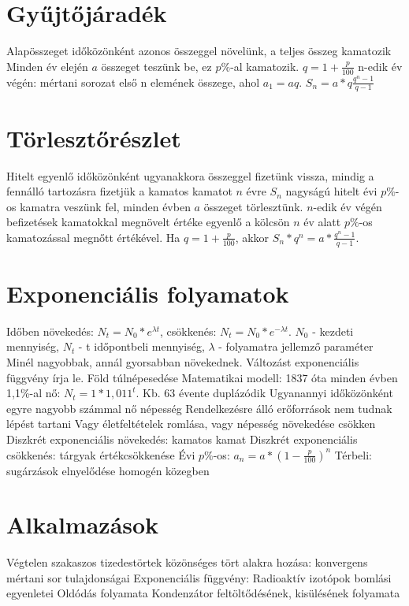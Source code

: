 \documentclass[twoside,12pt]{report}
\theoremstyle{definition}
\begin{document}
\section{Gyűjtőjáradék}
	\begin{outline}
		\1 Alapösszeget időközönként azonos összeggel növelünk, a teljes összeg kamatozik
		\1 Minden év elején $a$ összeget teszünk be, ez $p\%$-al kamatozik.
			\2 $q=1+\frac{p}{100}$
			\2 n-edik év végén: mértani sorozat első n elemének összege, ahol $a_1=aq$. $S_n=a*q\frac{q^n-1}{q-1}$
	\end{outline}
\section{Törlesztőrészlet}
	\begin{outline}
		\1 Hitelt egyenlő időközönként ugyanakkora összeggel fizetünk vissza, mindig a fennálló tartozásra fizetjük a kamatos kamatot
		\1 $n$ évre $S_n$ nagyságú hitelt évi $p\%$-os kamatra veszünk fel, minden évben $a$ összeget törlesztünk.
			\2 $n$-edik év végén befizetések kamatokkal megnövelt értéke egyenlő a kölcsön $n$ év alatt $p\%$-os kamatozással megnőtt értékével. Ha $q=1+\frac{p}{100}$, akkor $S_n*q^n=a*\frac{q^n-1}{q-1}$.
	\end{outline}
\section{Exponenciális folyamatok}
	\begin{outline}
		\1 Időben növekedés: $N_t=N_0*e^{\lambda t}$, csökkenés: $N_t=N_0*e^{-\lambda t}$.
			\2 $N_0$ - kezdeti mennyiség, $N_t$ - t időpontbeli mennyiség, $\lambda$ - folyamatra jellemző paraméter
		\1 Minél nagyobbak, annál gyorsabban növekednek. Változást exponenciális függvény írja le.
		\1 Föld túlnépesedése
			\2 Matematikai modell: 1837 óta minden évben 1,1\%-al nő: $N_t=1*1,011^t$.
				\3 Kb. 63 évente duplázódik
			\2 Ugyanannyi időközönként egyre nagyobb számmal nő népesség
			\2 Rendelkezésre álló erőforrások nem tudnak lépést tartani
			\2 Vagy életfeltételek romlása, vagy népesség növekedése csökken
		\1 Diszkrét exponenciális növekedés: kamatos kamat
		\1 Diszkrét exponenciális csökkenés: tárgyak értékcsökkenése
			\2 Évi $p\%$-os: $a_n=a*\left(1-\frac{p}{100}\right)^n$
		\1 Térbeli: sugárzások elnyelődése homogén közegben
	\end{outline}
\section{Alkalmazások}
	\begin{outline}
		\1 Végtelen szakaszos tizedestörtek közönséges tört alakra hozása: konvergens mértani sor tulajdonságai
		\1 Exponenciális függvény:
			\2 Radioaktív izotópok bomlási egyenletei
			\2 Oldódás folyamata
			\2 Kondenzátor feltöltődésének, kisülésének folyamata
	\end{outline}
\end{document}
